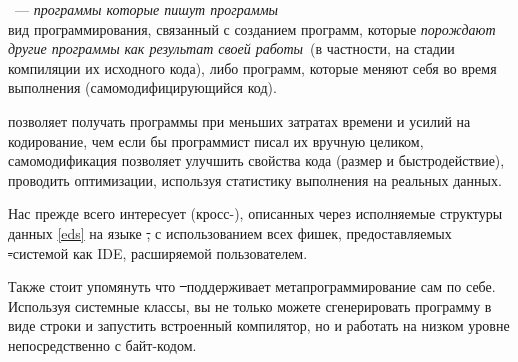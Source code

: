 \label{meta}\secdown

\ --- \textit{программы которые пишут программы}\\
вид программирования, связанный с созданием программ, 
которые \emph{порождают другие программы как результат своей работы}\ (в частности, на стадии компиляции их исходного кода), 
либо программ, которые меняют себя во время выполнения (самомодифицирующийся код).

\clearpage
{} позволяет получать программы при меньших затратах времени и 
усилий на кодирование, чем если бы программист писал их вручную целиком, 
самомодификация позволяет улучшить свойства кода (размер и быстродействие),
проводить оптимизации, используя статистику выполнения на реальных данных.

Нас прежде всего интересует (кросс-), описанных через исполняемые структуры данных \ref{eds}
на языке \st, с использованием всех фишек, предоставляемых \st-системой как IDE,
расширяемой пользователем.

Также стоит упомянуть что \st\ поддерживает метапрограммирование сам по себе. Используя системные классы,
вы не только можете сгенерировать программу в виде строки и запустить встроенный компилятор, но и 
работать на низком уровне непосредственно с байт-кодом.







\secup
